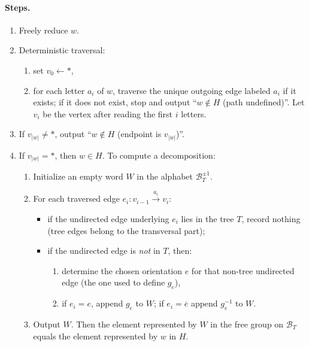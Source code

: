 \documentclass[11pt]{article}
\theoremstyle{definition}
\theoremstyle{plain}
\theoremstyle{remark}
\begin{document}
\paragraph{Steps.}
\begin{enumerate}[leftmargin=2.2em]
\item Freely reduce $w$.
\item Deterministic traversal:
\begin{enumerate}[leftmargin=2em]
\item set $v_0\leftarrow *$,
\item for each letter $a_i$ of $w$, traverse the unique outgoing edge labeled $a_i$ if it exists; if it does not exist, stop and output ``$w\notin H$ (path undefined)''.
Let $v_i$ be the vertex after reading the first $i$ letters.
\end{enumerate}
\item If $v_{|w|}\neq *$, output ``$w\notin H$ (endpoint is $v_{|w|}$)''.
\item If $v_{|w|}=*$, then $w\in H$. To compute a decomposition:
\begin{enumerate}[leftmargin=2em]
\item Initialize an empty word $W$ in the alphabet $\mathcal B_T^{\pm1}$.
\item For each traversed edge $e_i:v_{i-1}\xrightarrow{a_i}v_i$:
\begin{itemize}[leftmargin=2em]
\item if the undirected edge underlying $e_i$ lies in the tree $T$, record nothing (tree edges belong to the transversal part);
\item if the undirected edge is \emph{not} in $T$, then:
\begin{enumerate}[leftmargin=2em]
\item determine the chosen orientation $e$ for that non-tree undirected edge (the one used to define $g_e$),
\item if $e_i=e$, append $g_e$ to $W$; if $e_i=\overline e$ append $g_e^{-1}$ to $W$.
\end{enumerate}
\end{itemize}
\item Output $W$. Then the element represented by $W$ in the free group on $\mathcal B_T$ equals the element represented by $w$ in $H$.
\end{enumerate}
\end{enumerate}
\end{document}
